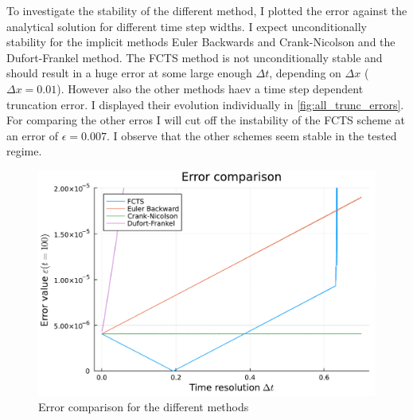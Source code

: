 \documentclass[
	a4paper, %
	10pt, %
]{CSUniSchoolLabReport}
\begin{document}
To investigate the stability of the different method, I plotted the error against the analytical solution for different time step widths. I expect unconditionally stability for the implicit methods Euler Backwards and Crank-Nicolson and the Dufort-Frankel method. The FCTS method is not unconditionally stable and should result in a huge error at some large enough $\Delta t$, depending on $\Delta x$ ($\Delta x = 0.01$). However also the other methods haev a time step dependent truncation error. I displayed their evolution individually in \autoref{fig:all_trunc_errors}.
For comparing the other erros I will cut off the instability of the FCTS scheme at an error of $\epsilon = 0.007$. I observe that the other schemes seem stable in the tested regime.


\begin{figure}[H]
	\centering
	\includegraphics[width=\textwidth]{../saves_t2/error_comp_diffusion.pdf}
	\caption{Error comparison for the different methods}
\end{figure}
\end{document}
